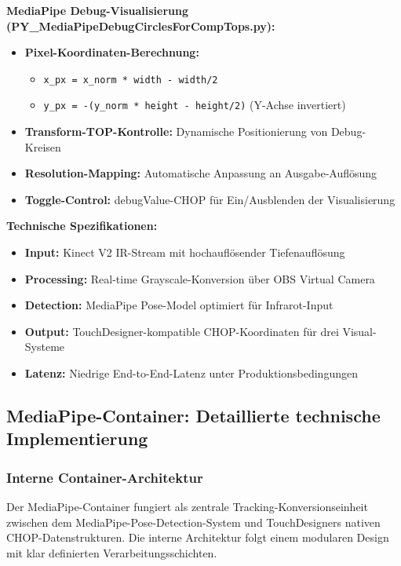 \textbf{MediaPipe Debug-Visualisierung (PY\_MediaPipeDebugCirclesForCompTops.py):}
\begin{itemize}
    \item \textbf{Pixel-Koordinaten-Berechnung:} 
    \begin{itemize}
        \item \texttt{x\_px = x\_norm * width - width/2}
        \item \texttt{y\_px = -(y\_norm * height - height/2)} (Y-Achse invertiert)
    \end{itemize}
    \item \textbf{Transform-TOP-Kontrolle:} Dynamische Positionierung von Debug-Kreisen
    \item \textbf{Resolution-Mapping:} Automatische Anpassung an Ausgabe-Auflösung
    \item \textbf{Toggle-Control:} debugValue-CHOP für Ein/Ausblenden der Visualisierung
\end{itemize}

\textbf{Technische Spezifikationen:}
\begin{itemize}
    \item \textbf{Input:} Kinect V2 IR-Stream mit hochauflösender Tiefenauflösung
    \item \textbf{Processing:} Real-time Grayscale-Konversion über OBS Virtual Camera
    \item \textbf{Detection:} MediaPipe Pose-Model optimiert für Infrarot-Input
    \item \textbf{Output:} TouchDesigner-kompatible CHOP-Koordinaten für drei Visual-Systeme
    \item \textbf{Latenz:} Niedrige End-to-End-Latenz unter Produktionsbedingungen
\end{itemize}

\newpage

\subsection{MediaPipe-Container: Detaillierte technische Implementierung}

\subsubsection{Interne Container-Architektur}

Der MediaPipe-Container fungiert als zentrale Tracking-Konversionseinheit zwischen dem MediaPipe-Pose-Detection-System und TouchDesigners nativen CHOP-Datenstrukturen. Die interne Architektur folgt einem modularen Design mit klar definierten Verarbeitungsschichten.

